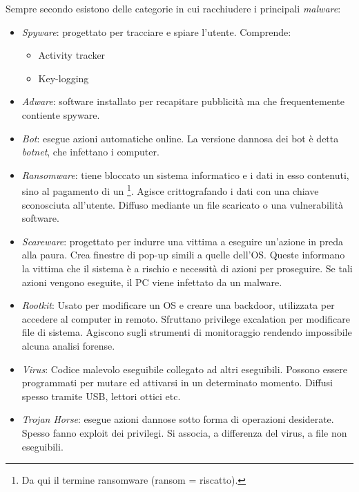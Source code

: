 \documentclass[14pt]{extreport}
\begin{document}
Sempre secondo \cite{cisco} esistono delle categorie in cui racchiudere i principali \textit{malware}:

\begin{itemize}
    \item \textit{Spyware}: progettato per tracciare e spiare l'utente. Comprende:
    \begin{itemize}
        \item Activity tracker
        \item Key-logging
    \end{itemize}
    \item \textit{Adware}: software installato per recapitare pubblicità ma che frequentemente contiente spyware.
    
    \item \textit{Bot}: esegue azioni automatiche online. La versione dannosa dei bot è detta \textit{botnet}, che infettano i computer.
    
    \item \textit{Ransomware}: tiene bloccato un sistema informatico e i dati in esso contenuti, sino al pagamento di un \footnote{Da qui il termine ransomware (ransom = riscatto).}. Agisce crittografando i dati con una chiave sconosciuta all'utente. Diffuso mediante un file scaricato o una vulnerabilità software.
    
    \item \textit{Scareware}: progettato per indurre una vittima a eseguire un'azione in preda alla paura. Crea finestre di pop-up simili a quelle dell'OS. Queste informano la vittima che il sistema è a rischio e necessità di azioni per proseguire. Se tali azioni vengono eseguite, il PC viene infettato da un malware.
    
    \item \textit{Rootkit}: Usato per modificare un OS e creare una backdoor, utilizzata per accedere al computer in remoto. Sfruttano privilege excalation per modificare file di sistema. Agiscono sugli strumenti di monitoraggio rendendo impossibile alcuna analisi forense.
    
    
    \item \textit{Virus}: Codice malevolo eseguibile collegato ad altri eseguibili. Possono essere programmati per mutare ed attivarsi in un determinato momento. Diffusi spesso tramite USB, lettori ottici etc.
    
    
    \item \textit{Trojan Horse}: esegue azioni dannose sotto forma di operazioni desiderate. Spesso fanno exploit dei privilegi. Si associa, a differenza del virus, a file non eseguibili.
    

\end{itemize}
\end{document}
